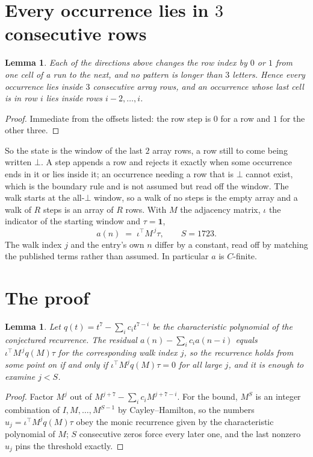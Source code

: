 \documentclass[11pt,a4paper]{article}
\theoremstyle{plain}
\newtheorem{lemma}[theorem]{Lemma}
\theoremstyle{definition}
\begin{document}
\section{Every occurrence lies in $3$ consecutive rows}

\begin{lemma}\label{lem:win}
Each of the directions above changes the row index by $0$ or $1$ from one cell of a run to the
next, and no pattern is longer than $3$ letters. Hence every occurrence lies inside $3$
consecutive array rows, and an occurrence whose last cell is in row $i$ lies inside rows
$i-2,\dots,i$.
\end{lemma}

\begin{proof}
Immediate from the offsets listed: the row step is $0$ for a row and $1$ for the other three.
\end{proof}

So the state is the window of the last $2$ array rows, a row still to come being written
$\bot$. A step appends a row and rejects it exactly when some occurrence ends in it or lies
inside it; an occurrence needing a row that is $\bot$ cannot exist, which is the boundary rule
and is not assumed but read off the window. The walk starts at the all-$\bot$ window, so a walk
of no steps is the empty array and a walk of $R$ steps is an array of $R$ rows. With $M$ the
adjacency matrix, $\iota$ the indicator of the starting window and $\tau=\mathbf{1}$,
\[
a(n)\;=\;\iota^{\!\top}M^{\,j}\tau ,\qquad S=1723.
\]
The walk index $j$ and the entry's own $n$ differ by a constant, read off by matching the
published terms rather than assumed. In particular $a$ is $C$-finite.

\section{The proof}

\begin{lemma}\label{lem:crit}
Let $q(t)=t^{7}-\sum_i c_it^{7-i}$ be the characteristic polynomial of the
conjectured recurrence. The residual $a(n)-\sum_ic_ia(n-i)$ equals
$\iota^{\!\top}M^{\,j}q(M)\tau$ for the corresponding walk index $j$, so the recurrence
holds from some point on if and only if $\iota^{\!\top}M^{j}q(M)\tau=0$ for all large $j$,
and it is enough to examine $j<S$.
\end{lemma}

\begin{proof}
Factor $M^{j}$ out of $M^{j+7}-\sum_ic_iM^{j+7-i}$. For the bound, $M^{S}$
is an integer combination of $I,M,\dots,M^{S-1}$ by Cayley--Hamilton, so the numbers
$u_j=\iota^{\!\top}M^{j}q(M)\tau$ obey the monic recurrence given by the characteristic
polynomial of $M$; $S$ consecutive zeros force every later one, and the last nonzero $u_j$
pins the threshold exactly.
\end{proof}
\end{document}
